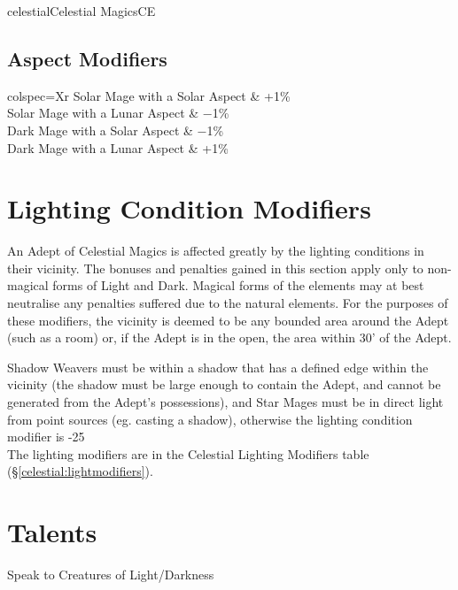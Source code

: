 \begin{College}[1.3]{celestial}{Celestial Magics}{CE}
\subsection{Aspect Modifiers}

\begin{dqtblr}{colspec={Xr}}
Solar Mage with a Solar Aspect	& +1\% \\
Solar Mage with a Lunar Aspect	& −1\% \\
Dark Mage with a Solar Aspect	& −1\% \\
Dark Mage with a Lunar Aspect	& +1\% \\
\end{dqtblr}

\section{Lighting Condition Modifiers}

An Adept of Celestial Magics is affected greatly by the lighting
conditions in their vicinity.  The bonuses and penalties gained in
this section apply only to non-magical forms of Light and Dark.
Magical forms of the elements may at best neutralise any penalties
suffered due to the natural elements.  For the purposes of these
modifiers, the vicinity is deemed to be any bounded area around the
Adept (such as a room) or, if the Adept is in the open, the area
within 30’ of the Adept.

Shadow Weavers must be within a shadow that has a defined edge within
the vicinity (the shadow must be large enough to contain the Adept,
and cannot be generated from the Adept’s possessions), and Star Mages
must be in direct light from point sources (eg. casting a shadow),
otherwise the lighting condition modifier is -25\\%

The lighting modifiers are in the Celestial Lighting Modifiers table
(\S\ref{celestial:lightmodifiers}).


\section{Talents}

\begin{talent}[T-1]{Speak to Creatures of Light/Darkness}


\end{talent}
\end{College}
